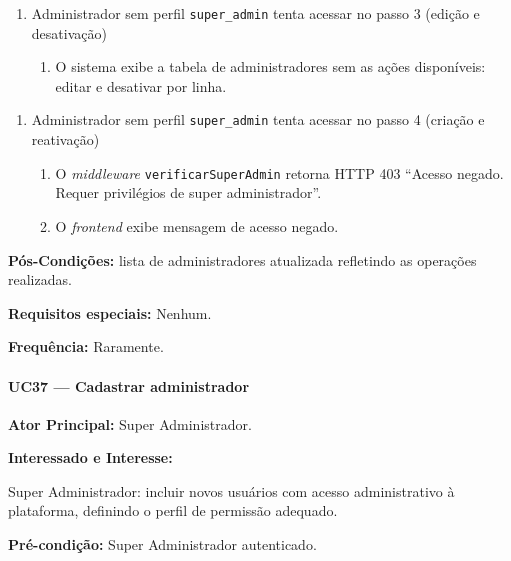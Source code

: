\begin{enumerate}
  \renewcommand{\theenumi}{3a}
  \renewcommand{\labelenumi}{\theenumi.}
  \item Administrador sem perfil \texttt{super\_admin}
tenta acessar no passo 3 (edição e desativação)
  \begin{enumerate}
  \item O sistema exibe a tabela de administradores sem as
        ações disponíveis: editar e desativar por linha.
  \end{enumerate}
\end{enumerate}
\begin{enumerate}
  \renewcommand{\theenumi}{4a}
  \renewcommand{\labelenumi}{\theenumi.}
  \item Administrador sem perfil \texttt{super\_admin}
tenta acessar no passo 4 (criação e reativação)
  \begin{enumerate}
  \item O \textit{middleware} \texttt{verificarSuperAdmin}
        retorna HTTP 403 ``Acesso negado. Requer
        privilégios de super administrador''.
  \item O \textit{frontend} exibe mensagem de acesso
        negado.
  \end{enumerate}
\end{enumerate}

\textbf{Pós-Condições:} lista de administradores
atualizada refletindo as operações realizadas.

\textbf{Requisitos especiais:} Nenhum.

\textbf{Frequência:} Raramente.

\paragraph{UC37 --- Cadastrar administrador}\hfill\break

\textbf{Ator Principal:} Super Administrador.

\textbf{Interessado e Interesse:}

Super Administrador: incluir novos usuários com acesso
administrativo à plataforma, definindo o perfil de
permissão adequado.

\textbf{Pré-condição:} Super Administrador autenticado.

